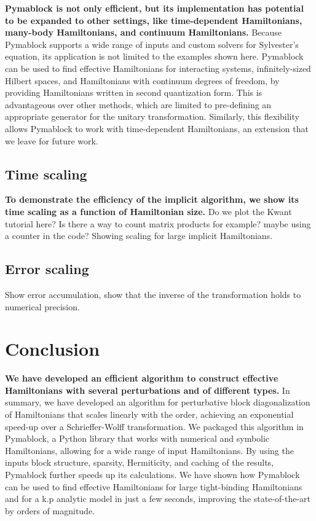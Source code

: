 \documentclass[submission, Codebases]{SciPost}
\begin{document}
{{\textbf{Pymablock is not only efficient, but its implementation has potential
to be expanded to other settings, like time-dependent Hamiltonians, many-body
Hamiltonians, and continuum Hamiltonians.}
Because Pymablock supports a wide range of inputs and custom solvers for
Sylvester's equation, its application is not limited to the examples shown
here.
Pymablock can be used to find effective Hamiltonians for interacting systems,
infinitely-sized Hilbert spaces, and Hamiltonians with continuum degrees of
freedom, by providing Hamiltonians written in second quantization form.
This is advantageous over other methods, which are limited to pre-defining
an appropriate generator for the unitary transformation.
Similarly, this flexibility allows Pymablock to work with time-dependent
Hamiltonians, an extension that we leave for future work.

\subsection{Time scaling}

\textbf{To demonstrate the efficiency of the implicit algorithm, we show its time
scaling as a function of Hamiltonian size.}
Do we plot the Kwant tutorial here? Is there a way to count matrix products for
example? maybe using a counter in the code?
Showing scaling for large implicit Hamiltonians.

\subsection{Error scaling}

Show error accumulation, show that the inverse of the transformation holds to numerical precision.

\section{Conclusion}

\textbf{We have developed an efficient algorithm to construct effective Hamiltonians
with several perturbations and of different types.}
In summary, we have developed an algorithm for perturbative block
diagonalization of Hamiltonians that scales linearly with the order,
achieving an exponential speed-up over a Schrieffer-Wolff transformation.
We packaged this algorithm in Pymablock, a Python library that works with
numerical and symbolic Hamiltonians, allowing for a wide range of input
Hamiltonians.
By using the inputs block structure, sparsity, Hermiticity, and caching of the
results, Pymablock further speeds up its calculations.
We have shown how Pymablock can be used to find effective Hamiltonians for
large tight-binding Hamiltonians and for a k.p analytic model in just a few
seconds, improving the state-of-the-art by orders of magnitude.

}}
\end{document}
